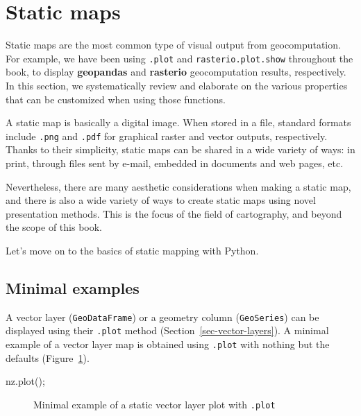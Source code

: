 \documentclass[
  letterpaper,
]{krantz}
\newenvironment{Shaded}{\begin{snugshade}}{\end{snugshade}}
\newcommand{\NormalTok}[1]{\textcolor[rgb]{0.00,0.23,0.31}{#1}}
\newcommand{\OperatorTok}[1]{\textcolor[rgb]{0.37,0.37,0.37}{#1}}
\begin{document}
\section{Static maps}\label{sec-static-maps}

Static maps are the most common type of visual output from
geocomputation. For example, we have been using \texttt{.plot} and
\texttt{rasterio.plot.show} throughout the book, to display
\textbf{geopandas} and \textbf{rasterio} geocomputation results,
respectively. In this section, we systematically review and elaborate on
the various properties that can be customized when using those
functions.

A static map is basically a digital image. When stored in a file,
standard formats include \texttt{.png} and \texttt{.pdf} for graphical
raster and vector outputs, respectively. Thanks to their simplicity,
static maps can be shared in a wide variety of ways: in print, through
files sent by e-mail, embedded in documents and web pages, etc.

Nevertheless, there are many aesthetic considerations when making a
static map, and there is also a wide variety of ways to create static
maps using novel presentation methods. This is the focus of the field of
cartography, and beyond the scope of this book.

Let's move on to the basics of static mapping with Python.

\subsection{Minimal examples}\label{minimal-examples}

A vector layer (\texttt{GeoDataFrame}) or a geometry column
(\texttt{GeoSeries}) can be displayed using their \texttt{.plot} method
(Section~\ref{sec-vector-layers}). A minimal example of a vector layer
map is obtained using \texttt{.plot} with nothing but the defaults
(Figure~\ref{fig-vector-minimal}).

\begin{Shaded}
\begin{Highlighting}[]
\NormalTok{nz.plot()}\OperatorTok{;}
\end{Highlighting}
\end{Shaded}

\begin{figure}[H]


\caption{\label{fig-vector-minimal}Minimal example of a static vector
layer plot with \texttt{.plot}}

\end{figure}%
\end{document}
